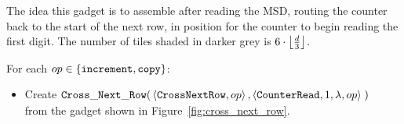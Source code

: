 
\subsubsection{\crossnextrow}

The idea this gadget is to assemble after reading the MSD, routing the counter back to the start of the
next row, in position for the counter to begin reading the first digit.
The number of tiles shaded in darker grey is $6 \cdot \floor*{\frac{d}{3}}$.

\vspace{.5cm}
For each $\inc\in \{ {\tt increment}, {\tt copy} \}$:

\begin{itemize}
    \item Create
    $\begin{aligned}[t]
        \crossnextrow(&\left\langle {\tt CrossNextRow},            \inc \right\rangle,
                       \left\langle {\tt CounterRead},        1, \lambda, \inc \right\rangle \;)
    \end{aligned}$\\from the gadget shown in Figure~\ref{fig:cross_next_row}.
\end{itemize}


